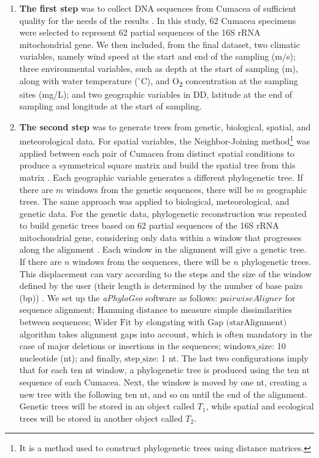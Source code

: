 \begin{enumerate}
\item \textbf{The first step} was to collect DNA sequences from Cumacea of sufficient quality for the needs of the results \citep{koshkarov_phylogeography_2022, li2023aphylogeo, li2024host}. In this study, 62 Cumacea specimens were selected to represent 62 partial sequences of the 16S rRNA mitochondrial gene. We then included, from the final dataset, two climatic variables, namely wind speed at the start and end of the sampling (m/s); three environmental variables, such as depth at the start of sampling (m), along with water temperature ($^\circ$C), and O\textsubscript{2} concentration at the sampling sites (mg/L); and two geographic variables in DD, latitude at the end of sampling and longitude at the start of sampling.

\item \textbf{The second step} was to generate trees from genetic, biological, spatial, and meteorological data. For spatial variables, the {Neighbor-Joining method}\footnote{It is a method used to construct phylogenetic trees using distance matrices.} was applied between each pair of Cumacea from distinct spatial conditions to produce a symmetrical square matrix and build the spatial tree from this matrix \citep{koshkarov_phylogeography_2022}. Each geographic variable generates a different phylogenetic tree. If there are $m$ windows from the genetic sequences, there will be $m$ geographic trees. The same approach was applied to biological, meteorological, and genetic data. For the genetic data, phylogenetic reconstruction was repeated to build genetic trees based on 62 partial sequences of the 16S rRNA mitochondrial gene, considering only data within a window that progresses along the alignment \citep{koshkarov_phylogeography_2022, li2023aphylogeo, li2024host}. Each window in the alignment will give a genetic tree. If there are $n$ windows from the sequences, there will be $n$ phylogenetic trees. This displacement can vary according to the steps and the size of the window defined by the user (their length is determined by the number of base pairs (bp)) \citep{koshkarov_phylogeography_2022, li2023aphylogeo, li2024host}. We set up the \textit{aPhyloGeo} software as follows: $pairwiseAligner$ for sequence alignment; $\text{Hamming distance}$ to measure simple dissimilarities between sequences; $\text{Wider Fit by elongating with Gap (starAlignment)}$ algorithm takes alignment gaps into account, which is often mandatory in the case of major deletions or insertions in the sequences; $\text{windows\_size}$: 10 nucleotide (nt); and finally, $\text{step\_size}$: 1 nt. The last two configurations imply that for each ten nt window, a phylogenetic tree is produced using the ten nt sequence of each Cumacea. Next, the window is moved by one nt, creating a new tree with the following ten nt, and so on until the end of the alignment. Genetic trees will be stored in an object called $T_1$, while spatial and ecological trees will be stored in another object called $T_2$.


\end{enumerate}
